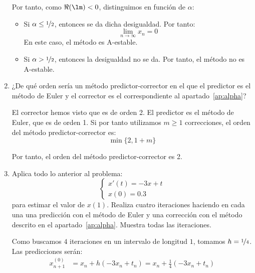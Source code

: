 \begin{ejercicio}
\begin{enumerate}
        Por tanto, como $\Re(\lm) < 0$, distinguimos en función de $\alpha$:
        \begin{itemize}
            \item Si $\alpha \leq \nicefrac{1}{2}$, entonces se da dicha desigualdad. Por tanto:
            \begin{equation*}
                \lim_{n\to\infty} x_n = 0
            \end{equation*}
            En este caso, el método es A-estable.

            \item Si $\alpha > \nicefrac{1}{2}$, entonces la desigualdad no se da. Por tanto, el método no es A-estable.
        \end{itemize}

        \item ¿De qué orden sería un método predictor-corrector en el que el predictor es el método de Euler y el corrector es el correspondiente al apartado~\ref{ap:alpha}?
        
        El corrector hemos visto que es de orden 2. El predictor es el método de Euler, que es de orden 1. Si por tanto utilizamos $m\geq 1$ correcciones, el orden del método predictor-corrector es:
        \begin{equation*}
            \min\{2,1+m\}
        \end{equation*}

        Por tanto, el orden del método predictor-corrector es 2.
        \item Aplica todo lo anterior al problema:
            \begin{equation*}
                \begin{cases}
                    x'(t) = -3x + t \\
                    x(0) = 0.3
                \end{cases}
            \end{equation*}
            para estimar el valor de $x(1)$. Realiza cuatro iteraciones haciendo en cada una una predicción con el método de Euler y una corrección con el método descrito en el apartado~\ref{ap:alpha}. Muestra todas las iteraciones.


            Como buscamos $4$ iteraciones en un intervalo de longitud $1$, tomamos $h = \nicefrac{1}{4}$. Las predicciones serán:
            \begin{align*}
                x_{n+1}^{(0)} &= x_n + h(-3x_n + t_n) = x_n + \frac{1}{4}(-3x_n + t_n)
            \end{align*}


\end{enumerate}
\end{ejercicio}
